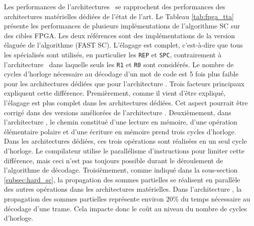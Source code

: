 Les performances de l'architectures \TTSC~se rapprochent des performances des architectures matérielles dédiées de l'état de l'art. Le Tableau \ref{tab:fpga_tta} présente les performances de plusieurs implémentations de l'algorithme SC sur des cibles FPGA. Les deux références \cite{sarkis_fast_2014,giard_638_2015} sont des implémentations de la version élaguée de l'algorithme (FAST SC). L'élagage est complet, c'est-à-dire que tous les \noeuds spécialisés sont utilisés, en particulier les \noeuds \texttt{REP} et \texttt{SPC}, contrairement à l'architecture \TTSC~dans laquelle seuls les \noeuds \texttt{R1} et \texttt{R0} sont considérés. Le nombre de cycles d'horloge nécessaire au décodage d'un mot de code est 5 fois plus faible pour les architectures dédiées que pour l'architecture \TTSC. Trois facteurs principaux expliquent cette différence. Premièrement, comme il vient d'être expliqué, l'élagage est plus complet dans les architectures dédiées. Cet aspect pourrait être corrigé dans des versions améliorées de l'architecture \TTSC. Deuxièmement, dans l'architecture \TTSC, le chemin constitué d'une lecture en mémoire, d'une opération élémentaire polaire et d'une écriture en mémoire prend trois cycles d'horloge. Dans les architectures dédiées, ces trois opérations sont réalisées en un seul cycle d'horloge. Le compilateur utilise le parallélisme d'instructions pour limiter cette différence, mais ceci n'est pas toujours possible durant le déroulement de l'algorithme de décodage. Troisièmement, comme indiqué dans la sous-section \ref{subsec:hard_sc}, la propagation des sommes partielles se réalisent en parallèle des autres opérations dans les architectures matérielles. Dans l'architecture \TTSC, la propagation des sommes partielles représente environ 20\% du temps nécessaire au décodage d'une trame. Cela impacte donc le coût au niveau du nombre de cycles d'horloge.


